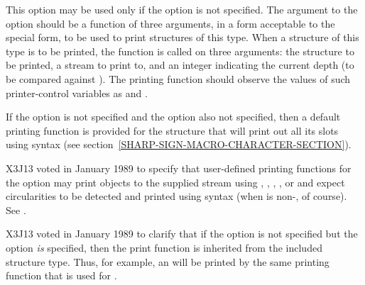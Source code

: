 \begin{flushdesc}
\item[\cd{:print-function}]
This option may be used only if the 
option is not specified.
The argument to the  option
should be a function of three arguments,
in a form acceptable to the  special form,
to be used to print structures of this type.
When a structure of this type is to be printed, the function
is called on three arguments:
the structure to be printed, a stream to print to,
and an integer indicating the current depth (to be compared against
).
The printing function should observe the values of
such printer-control variables as 
and .

If the  option is not specified and the 
option also not specified, then a default printing function is
provided for the structure that will print out all its slots
using  syntax (see section~\ref{SHARP-SIGN-MACRO-CHARACTER-SECTION}).

\begin{new}
X3J13 voted in January 1989
to specify that user-defined printing functions for the 
 option may print objects to the
supplied stream using , , , ,
or  and expect circularities to be detected and printed
using  syntax (when  is non-, of course).
See .
\end{new}


\begin{new}
X3J13 voted in January 1989
to clarify that if the 
option is not specified but the  option {\it is} specified,
then the print function is inherited from the included structure type.
Thus, for example, an  will be printed by the same
printing function that is used for .


\end{new}
\end{flushdesc}
